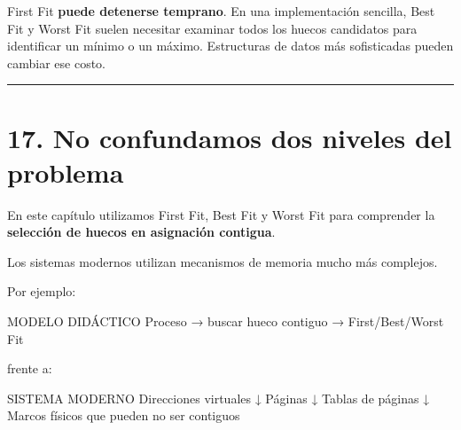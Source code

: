\documentclass[
  spanish,
  letterpaper,
]{scrbook}
\newenvironment{Shaded}{\begin{snugshade}}{\end{snugshade}}
\newcommand{\NormalTok}[1]{\textcolor[rgb]{0.00,0.23,0.31}{#1}}
\begin{document}
\begin{tcolorbox}[enhanced jigsaw, arc=.35mm, bottomrule=.15mm, bottomtitle=1mm, breakable, colback=white, colbacktitle=quarto-callout-note-color!10!white, colframe=quarto-callout-note-color-frame, coltitle=black, left=2mm, leftrule=.75mm, opacityback=0, opacitybacktitle=0.6, rightrule=.15mm, title=\textcolor{quarto-callout-note-color}{\faInfo}\hspace{0.5em}{Observe el costo de búsqueda}, titlerule=0mm, toprule=.15mm, toptitle=1mm]

First Fit \textbf{puede detenerse temprano}. En una implementación
sencilla, Best Fit y Worst Fit suelen necesitar examinar todos los
huecos candidatos para identificar un mínimo o un máximo. Estructuras de
datos más sofisticadas pueden cambiar ese costo.

\end{tcolorbox}

\begin{center}\rule{0.5\linewidth}{0.5pt}\end{center}


\chapter{17. No confundamos dos niveles del
problema}\label{no-confundamos-dos-niveles-del-problema-1}

En este capítulo utilizamos First Fit, Best Fit y Worst Fit para
comprender la \textbf{selección de huecos en asignación contigua}.

Los sistemas modernos utilizan mecanismos de memoria mucho más
complejos.

Por ejemplo:

\begin{Shaded}
\begin{Highlighting}[]
\NormalTok{MODELO DIDÁCTICO}
\NormalTok{Proceso → buscar hueco contiguo → First/Best/Worst Fit}
\end{Highlighting}
\end{Shaded}

frente a:

\begin{Shaded}
\begin{Highlighting}[]
\NormalTok{SISTEMA MODERNO}
\NormalTok{Direcciones virtuales}
\NormalTok{        ↓}
\NormalTok{Páginas}
\NormalTok{        ↓}
\NormalTok{Tablas de páginas}
\NormalTok{        ↓}
\NormalTok{Marcos físicos que pueden no ser contiguos}
\end{Highlighting}
\end{Shaded}
\end{document}
